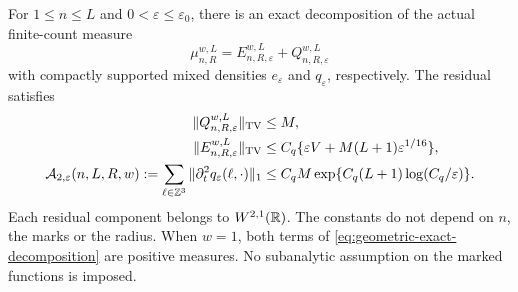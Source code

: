 \begin{theorem}
\label{thm:geometric-extraction-budget}
For $1\le n\le L$ and $0<\varepsilon\le\varepsilon_0$, there is an exact
decomposition of the actual finite-count measure
\begin{equation}\label{eq:geometric-exact-decomposition}
 \mu_{n,R}^{w,L}=E_{n,R,\varepsilon}^{w,L}
                         +Q_{n,R,\varepsilon}^{w,L}
\end{equation}
with compactly supported mixed densities $e_\varepsilon$ and
$q_\varepsilon$, respectively. The residual satisfies
\begin{align}
 \|Q_{n,R,\varepsilon}^{w,L}\|_{\TV}&\le M,\notag\\
 \|E_{n,R,\varepsilon}^{w,L}\|_{\TV}
     &\le C_q\{\varepsilon V+M(L+1)\varepsilon^{1/16}\},
                   \label{eq:geometric-extraction-mass}\\
 \mathcal A_{2,\varepsilon}(n,L,R,w)
  :=\sum_{\ell\in\Z^3}\|\partial_t^2q_\varepsilon(\ell,\cdot)\|_1
     &\le C_q M\exp\{C_q(L+1)\log(C_q/\varepsilon)\}.
                   \label{eq:geometric-derivative-budget}
\end{align}
Each residual component belongs to $W^{2,1}(\mathbb R)$. The constants do not
depend on $n$, the marks or the radius. When $w=1$, both terms of
\eqref{eq:geometric-exact-decomposition} are positive measures.
No subanalytic assumption on the marked functions is imposed.
\end{theorem}
